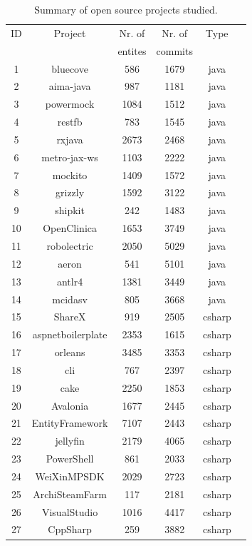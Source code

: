 \documentclass[a4paper,twoside]{article}
\begin{document}
\begin{table}[!h]
\caption{Summary of open source projects studied.}
\label{table:1}
\centering
\begin{tabular}{|c|c|c|c|c|c|}
\hline
   ID  & Project    & Nr. of & Nr. of& Type\\
     &     & entites & commits & \\
\hline
1	&	bluecove	&	586	&	1679	&	java	\\
2	&	aima-java	&	987	&	1181	&	java	\\
3	&	powermock	&	1084	&	1512	&	java	\\
4	&	restfb	&	783	&	1545	&	java	\\
5	&	rxjava	&	2673	&	2468	&	java	\\
6	&	metro-jax-ws	&	1103	&	2222	&	java	\\
7	&	mockito	&	1409	&	1572	&	java	\\
8	&	grizzly	&	1592	&	3122	&	java	\\
9	&	shipkit	&	242	&	1483	&	java	\\
10	&	OpenClinica	&	1653	&	3749	&	java	\\
11	&	robolectric	&	2050	&	5029	&	java	\\
12	&	aeron	&	541	&	5101	&	java	\\
13	&	antlr4	&	1381	&	3449	&	java	\\
14	&	mcidasv	&	805	&	3668	&	java	\\
15	&	ShareX	&	919	&	2505	&	csharp	\\
16	&	aspnetboilerplate	&	2353	&	1615	&	csharp	\\
17	&	orleans	&	3485	&	3353	&	csharp	\\
18	&	cli	&	767	&	2397	&	csharp	\\
19	&	cake	&	2250	&	1853	&	csharp	\\
20	&	Avalonia	&	1677	&	2445	&	csharp	\\
21	&	EntityFramework	&	7107	&	2443	&	csharp	\\
22	&	jellyfin	&	2179	&	4065	&	csharp	\\
23	&	PowerShell	&	861	&	2033	&	csharp	\\
24	&	WeiXinMPSDK	&	2029	&	2723	&	csharp	\\
25	&	ArchiSteamFarm	&	117	&	2181	&	csharp	\\
26	&	VisualStudio	&	1016	&	4417	&	csharp	\\
27	&	CppSharp	&	259	&	3882	&	csharp	\\
\hline
\end{tabular}
\end{table}
\end{document}

